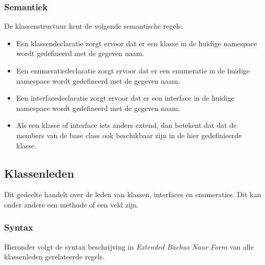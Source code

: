 \subsubsection{Semantiek}
De klassenstructuur kent de volgende semantische regels:

\begin{itemize}
	\item Een klassendeclaratie zorgt ervoor dat er een klasse in de huidige namespace wordt gedefineerd met de gegeven naam.
	\item Een enumeratiedeclaratie zorgt ervoor dat er een enumeratie in de huidige namespace wordt gedefineerd met de gegeven naam.
	\item Een interfacedeclaratie zorgt ervoor dat er een interface in de huidige namespace wordt gedefineerd met de gegeven naam.
	\item Als een klasse of interface iets anders extend, dan betekent dat dat de members van de base class ook beschikbaar zijn in de hier gedefinieerde klasse.
\end{itemize}

\subsection{Klassenleden}
Dit gedeelte handelt over de leden van klassen, interfaces en enumeraties. Dit kan onder andere een methode of een veld zijn.

\subsubsection{Syntax}
Hieronder volgt de syntax beschrijving in \textit{Extended Bachus Naur Form} van alle klassenleden gerelateerde regels.

